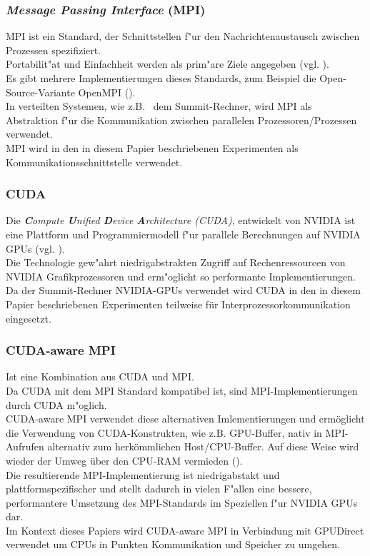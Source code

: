 \subsubsection{ \textit{Message Passing Interface} (MPI) }
MPI ist ein Standard, der Schnittstellen f"ur den Nachrichtenaustausch zwischen Prozessen spezifiziert.\\
Portabilit"at und Einfachheit werden als prim"are Ziele angegeben (vgl. \cite[Kap. 1.1]{mpi}).\\
Es gibt mehrere Implementierungen dieses Standards, zum Beispiel die Open-Source-Variante OpenMPI (\cite{openmpi}).\\
In verteilten Systemen, wie z.B.~ dem Summit-Rechner, wird MPI als Abstraktion f"ur die Kommunikation zwischen parallelen Prozessoren/Prozessen verwendet.\\
MPI wird in den in diesem Papier beschriebenen Experimenten als Kommunikationsschnittstelle verwendet.

\subsubsection{ CUDA }
Die \textit{\textbf{C}ompute \textbf{U}nified \textbf{D}evice \textbf{A}rchitecture (CUDA)}, entwickelt von NVIDIA ist eine Plattform und Programmiermodell f"ur parallele Berechnungen auf NVIDIA GPUs (vgl. \cite{cuda}).\\
Die Technologie gew"ahrt niedrigabstrakten Zugriff auf Rechenressourcen von NVIDIA Grafikprozessoren und erm"oglicht so performante Implementierungen.\\
Da der Summit-Rechner NVIDIA-GPUs verwendet wird CUDA in den in diesem Papier beschriebenen Experimenten teilweise für Interprozessorkommunikation eingesetzt.


\subsubsection{ CUDA-aware MPI }
Ist eine Kombination aus CUDA und MPI.\\
Da CUDA mit dem MPI Standard kompatibel ist, sind MPI-Implementierungen durch CUDA m"oglich.\\
CUDA-aware MPI verwendet diese alternativen Imlementierungen und ermöglicht die Verwendung von CUDA-Konstrukten, wie z.B. GPU-Buffer, nativ in MPI-Aufrufen alternativ zum herkömmlichen Host/CPU-Buffer. Auf diese Weise wird wieder der Umweg über den CPU-RAM vermieden (\cite{cudampi}).\\
Die resultierende MPI-Implementierung ist niedrigabstakt und plattformspezifischer und stellt dadurch in vielen F"allen eine bessere, performantere Umsetzung des MPI-Standards im Speziellen f"ur NVIDIA GPUs dar.\\
Im Kontext dieses Papiers wird CUDA-aware MPI in Verbindung mit GPUDirect verwendet um CPUs in Punkten Kommunikation und Speicher zu umgehen.

